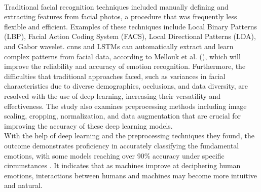 \\
\indent Traditional facial recognition techniques included manually defining and extracting features from facial photos, a procedure that was frequently less flexible and efficient. 
Examples of these techniques include Local Binary Patterns (LBP), Facial Action Coding System (FACS), Local Directional Patterns (LDA), and Gabor wavelet. 
\gls{cnns} and LSTMs can automatically extract and learn complex patterns from facial data, according to Mellouk et al. (\citeyear{mellouk_2020_facial}), which will improve the reliability and accuracy of emotion recognition. 
Furthermore, the difficulties that traditional approaches faced, such as variances in facial characteristics due to diverse demographics, occlusions, and data diversity, are resolved with the use of deep learning, increasing their versatility and effectiveness.
The study also examines preprocessing methods including image scaling, cropping, normalization, and data augmentation that are crucial for improving the accuracy of these deep learning models.
\\
\indent With the help of deep learning and the preprocessing techniques they found, the outcome demonstrates proficiency in accurately classifying the fundamental emotions, with some models reaching over 90\% accuracy under specific circumstances \citep{mellouk_2020_facial}. 
It indicates that as machines improve at deciphering human emotions, interactions between humans and machines may become more intuitive and natural.
\begin{figure}[H]
    \centering
    \qquad
    \vspace{0.5cm}
    \\
    \scriptsize{\citep{agrawal_2019_using}}
\end{figure}
